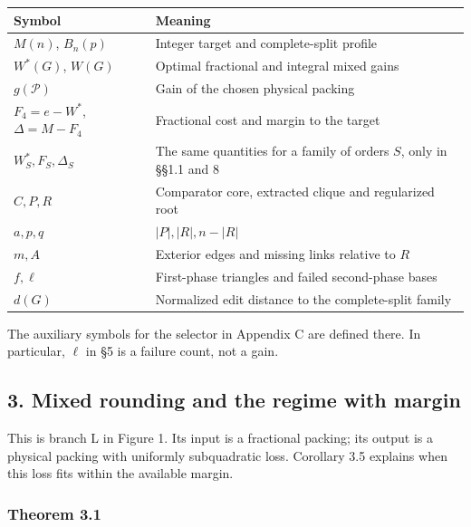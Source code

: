 \documentclass[english,11pt,a4paper]{article}
\newcounter{none}
\begin{document}
{\def\LTcaptype{none} %
\begin{longtable}[c]{@{}
  >{\raggedright\arraybackslash}p{}
  >{\raggedright\arraybackslash}p{}@{}}
\toprule\noalign{}
\begin{minipage}[b]{\linewidth}\raggedright
Symbol
\end{minipage} & \begin{minipage}[b]{\linewidth}\raggedright
Meaning
\end{minipage} \\
\midrule\noalign{}
\endhead
\bottomrule\noalign{}
\endlastfoot
\(M(n)\), \(B_n(p)\) & Integer target and complete-split profile \\
\(W^*(G)\), \(W(G)\) & Optimal fractional and integral mixed gains \\
\(g(\mathcal P)\) & Gain of the chosen physical packing \\
\(F_4=e-W^*\), \(\Delta=M-F_4\) & Fractional cost and margin to the target \\
\(W_S^*,F_S,\Delta_S\) & The same quantities for a family of orders \(S\), only in §§1.1 and 8 \\
\(C,P,R\) & Comparator core, extracted clique and regularized root \\
\(a,p,q\) & \(|P|,|R|,n-|R|\) \\
\(m,A\) & Exterior edges and missing links relative to \(R\) \\
\(f,\ell\) & First-phase triangles and failed second-phase bases \\
\(d(G)\) & Normalized edit distance to the complete-split family \\
\end{longtable}
}

The auxiliary symbols for the selector in Appendix C are defined there. In particular, \(\ell\) in §5 is a failure count, not a gain.

\subsection{3. Mixed rounding and the regime with margin}\label{mixed-rounding-and-the-regime-with-margin}

This is branch L in Figure 1. Its input is a fractional packing; its output is a physical packing with uniformly subquadratic loss. Corollary 3.5 explains when this loss fits within the available margin.

\subsubsection{Theorem 3.1}\label{theorem-3.1}
\end{document}
